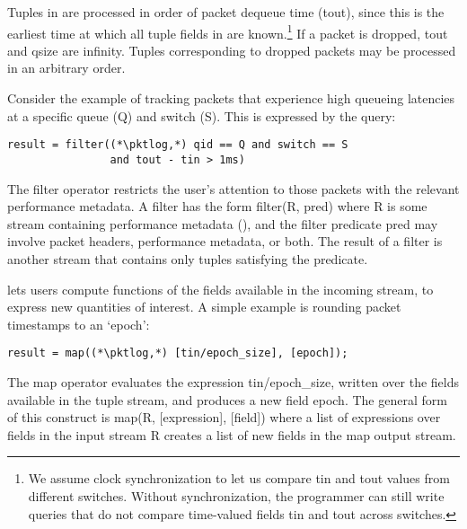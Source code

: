 Tuples in {\ct \pktlog} are processed in
order of packet dequeue time
({\ct tout}), since this is the earliest time at which all tuple fields in {\ct
\pktlog} are known.\footnote{We assume clock synchronization
to let us compare {\ctfoot tin} and {\ctfoot tout} values from different
switches. Without
synchronization, the programmer can still write queries
that do not compare time-valued fields {\ctfoot tin} and {\ctfoot tout} across
switches.}
%
%
If a packet is dropped, {\ct tout} and {\ct qsize} are {\ct
infinity.} Tuples corresponding to dropped packets may be processed in an
arbitrary order.

 Consider the
example of tracking packets that experience high queueing latencies at a
specific queue ({\ct Q}) and switch ({\ct S}). This is expressed by
the query:
\begin{lstlisting}
result = filter((*\pktlog,*) qid == Q and switch == S
                and tout - tin > 1ms)
\end{lstlisting}
The {\ct filter} operator restricts the user's attention to those packets with
the relevant performance metadata. A filter has the form {\ct filter(R, pred)}
where {\ct R} is some stream containing performance metadata (\eg {\ct
\pktlog}), and the filter predicate {\ct pred} may involve packet headers,
performance metadata, or both. The result of a {\ct filter} is another stream that
contains only tuples satisfying the predicate.

 \TheSystem lets users compute
functions of the fields available in the incoming stream, to express new quantities
of interest. A simple example is rounding packet timestamps to an `epoch':
\begin{lstlisting}
result = map((*\pktlog,*) [tin/epoch_size], [epoch]);
\end{lstlisting}
The {\ct map} operator evaluates the expression {\ct tin/epoch\_size}, written over the
fields available in the tuple stream, and produces a new field {\ct
  epoch}. The general form of this construct is {\ct map(R, [expression],
  [field])} where a list of {\ct expression}s over fields in the input stream
{\ct R} creates a list of new {\ct field}s in the {\ct map} output stream.

